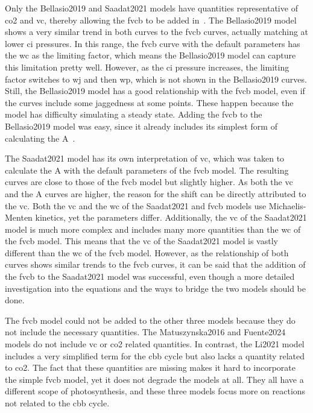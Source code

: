 Only the Bellasio2019 and Saadat2021 models have quantities representative of \gls{co2} and \gls{vc}, thereby allowing the \gls{fvcb} to be added in~. The Bellasio2019 model shows a very similar trend in both curves to the \gls{fvcb} curves, actually matching at lower \gls{ci} pressures. In this range, the \gls{fvcb} curve with the default parameters has the \gls{wc} as the limiting factor, which means the Bellasio2019 model can capture this limitation pretty well. However, as the \gls{ci} pressure increases, the limiting factor switches to \gls{wj} and then \gls{wp}, which is not shown in the Bellasio2019 curves. Still, the Bellasio2019 model has a good relationship with the \gls{fvcb} model, even if the curves include some jaggedness at some points. These happen because the model has difficulty simulating a steady state. Adding the \gls{fvcb} to the Bellasio2019 model was easy, since it already includes its simplest form of calculating the \gls{A}~.

The Saadat2021 model has its own interpretation of \gls{vc}, which was taken to calculate the \gls{A} with the default parameters of the \gls{fvcb} model. The resulting curves are close to those of the \gls{fvcb} model but slightly higher. As both the \gls{vc} and the \gls{A} curves are higher, the reason for the shift can be directly attributed to the \gls{vc}. Both the \gls{vc} and the \gls{wc} of the Saadat2021 and \gls{fvcb} models use Michaelis-Menten kinetics, yet the parameters differ. Additionally, the \gls{vc} of the Saadat2021 model is much more complex and includes many more quantities than the \gls{wc} of the \gls{fvcb} model. This means that the \gls{vc} of the Saadat2021 model is vastly different than the \gls{wc} of the \gls{fvcb} model. However, as the relationship of both curves shows similar trends to the \gls{fvcb} curves, it can be said that the addition of the \gls{fvcb} to the Saadat2021 model was successful, even though a more detailed investigation into the equations and the ways to bridge the two models should be done.

The \gls{fvcb} model could not be added to the other three models because they do not include the necessary quantities. The Matuszynska2016 and Fuente2024 models do not include \gls{vc} or \gls{co2} related quantities. In contrast, the Li2021 model includes a very simplified term for the \gls{cbb} cycle but also lacks a quantity related to \gls{co2}. The fact that these quantities are missing makes it hard to incorporate the simple \gls{fvcb} model, yet it does not degrade the models at all. They all have a different scope of photosynthesis, and these three models focus more on reactions not related to the \gls{cbb} cycle.

